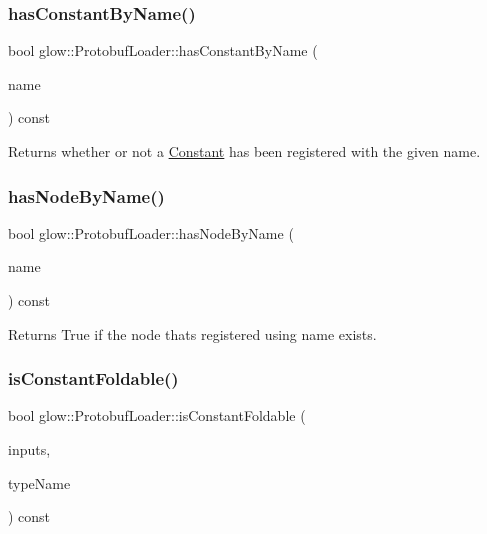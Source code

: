 \subsubsection{\texorpdfstring{has\+Constant\+By\+Name()}{hasConstantByName()}}
{\footnotesize\ttfamily bool glow\+::\+Protobuf\+Loader\+::has\+Constant\+By\+Name (\begin{DoxyParamCaption}\item[{llvm\+::\+String\+Ref}]{name }\end{DoxyParamCaption}) const\hspace{0.3cm}{\ttfamily [protected]}}

\begin{DoxyReturn}{Returns}
whether or not a \hyperlink{classglow_1_1_constant}{Constant} has been registered with the given {\ttfamily name}. 
\end{DoxyReturn}
\mbox{\label{classglow_1_1_protobuf_loader_a50508e4cbe83b3cafd7d7319199c0fb7}} 
\subsubsection{\texorpdfstring{has\+Node\+By\+Name()}{hasNodeByName()}}
{\footnotesize\ttfamily bool glow\+::\+Protobuf\+Loader\+::has\+Node\+By\+Name (\begin{DoxyParamCaption}\item[{llvm\+::\+String\+Ref}]{name }\end{DoxyParamCaption}) const}

\begin{DoxyReturn}{Returns}
True if the node that\textquotesingle{}s registered using {\ttfamily name} exists. 
\end{DoxyReturn}
\mbox{\label{classglow_1_1_protobuf_loader_a60ed5b8175104dffe27f3f88b45ceede}} 
\subsubsection{\texorpdfstring{is\+Constant\+Foldable()}{isConstantFoldable()}}
{\footnotesize\ttfamily bool glow\+::\+Protobuf\+Loader\+::is\+Constant\+Foldable (\begin{DoxyParamCaption}\item[{llvm\+::\+Array\+Ref$<$ \hyperlink{structglow_1_1_node_value}{Node\+Value} $>$}]{inputs,  }\item[{std\+::string}]{type\+Name }\end{DoxyParamCaption}) const}

